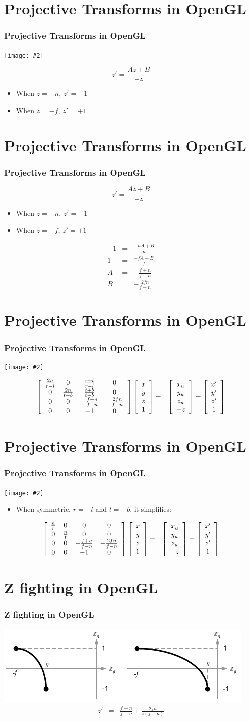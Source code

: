 \documentclass[slidestop,xcolor=pst]{beamer}
\newcommand{\graphc}[2]{\centerline{\texttt{[image: \#2]}}}
\newcommand{\sect}[1]{
\section{#1}
\begin{frame}[fragile]\frametitle{#1}
}
\begin{document}
\sect{Projective Transforms in OpenGL}
\graphc{.8}{gl_projectionmatrix01.png}
\[
z' =\frac{Az + B}{-z}
\]
\pause
\begin{itemize}
\item When $z = -n$, $z' = -1$
\item When $z = -f$, $z' = +1$
\end{itemize}
\end{frame}

\sect{Projective Transforms in OpenGL}
\[
z' =\frac{Az + B}{-z}
\]
\begin{itemize}
\item When $z = -n$, $z' = -1$
\item When $z = -f$, $z' = +1$
\end{itemize}
\begin{eqnarray*}
-1 &=& \frac{-nA+B}{n}\\
1 &=& \frac{-fA+B}{f}\\
A &=& -\frac{f+n}{f-n}\\
B &=& -\frac{2fn}{f-n}
\end{eqnarray*}
\end{frame}

\sect{Projective Transforms in OpenGL}
\graphc{.8}{gl_projectionmatrix01.png}
\begin{eqnarray*}
\left[\begin{array}{cccc} \frac{2n}{r-l}& 0 & \frac{r+l}{r-l}& 0 \\ 0 & \frac{2n}{t-b}&\frac{t+b}{t-b}& 0 \\ 0&0& -\frac{f+n}{f-n}& -\frac{2fn}{f-n} \\ 0&0&-1&0\end{array}\right]
\left[\begin{array}{c} x\\y\\z \\ 1\end{array}\right]
&=&\left[\begin{array}{c} x_u\\y_u\\z_u\\-z \end{array}\right]
=\left[\begin{array}{c} x'\\y'\\z' \\ 1\end{array}\right]
  \end{eqnarray*}
\end{frame}

\sect{Projective Transforms in OpenGL}
\graphc{.8}{gl_projectionmatrix01.png}
\begin{itemize}
\item When symmetric, $r=-l$ and $t=-b$, it simplifies:
\end{itemize}
\begin{eqnarray*}
\left[\begin{array}{cccc} \frac{n}{r}& 0 & 0& 0 \\ 0 & \frac{n}{t}&0& 0 \\ 0&0& -\frac{f+n}{f-n}& -\frac{2fn}{f-n} \\ 0&0&-1&0\end{array}\right]
\left[\begin{array}{c} x\\y\\z \\ 1\end{array}\right]
&=&\left[\begin{array}{c} x_u\\y_u\\z_u\\-z \end{array}\right]
=\left[\begin{array}{c} x'\\y'\\z' \\ 1\end{array}\right]
  \end{eqnarray*}
\end{frame}


\sect{Z fighting in OpenGL}
\includegraphics[width=\textwidth]{gl_projectionmatrix07.png}
\begin{eqnarray*}
z' &=& \frac{f+n}{f-n} + \frac{2fn}{z(f-n)}
\end{eqnarray*}
\end{frame}
\end{document}
